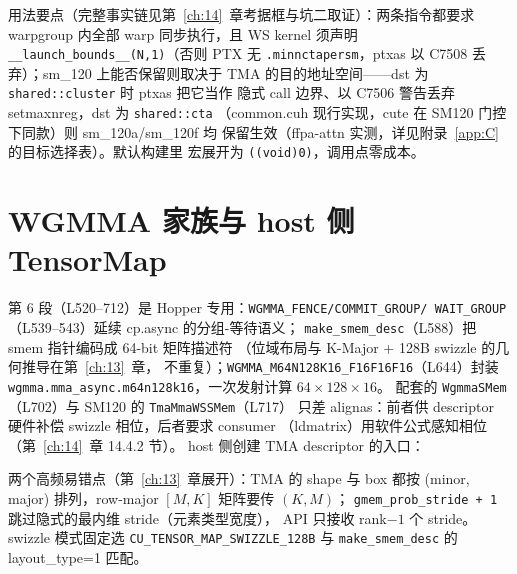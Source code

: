 

用法要点（完整事实链见第~\ref{ch:14}~章考据框与坑二取证）：两条指令都要求
warpgroup 内全部 warp 同步执行，且 WS kernel 须声明
\texttt{\_\allowbreak{}\_\allowbreak{}launch\_\allowbreak{}bounds\_\allowbreak{}\_\allowbreak{}(N,\allowbreak{}1)}（否则 PTX 无
\texttt{.minnctapersm}，ptxas 以 C7508 丢弃）；sm\_120 上能否保留则取决于
TMA 的目的地址空间——dst 为 \texttt{shared::cluster} 时 ptxas 把它当作
隐式 call 边界、以 C7506 警告丢弃 setmaxnreg，dst 为 \texttt{shared::cta}
（common.cuh 现行实现，cute 在 SM120 门控下同款）则 sm\_120a/sm\_120f 均
保留生效（ffpa-attn 实测，详见附录~\ref{app:C} 的目标选择表）。默认构建里
宏展开为 \texttt{((void)0)}，调用点零成本。

\section{WGMMA 家族与 host 侧 TensorMap}

第 6 段（L520--712）是 Hopper 专用：\texttt{WGMMA\_\allowbreak{}FENCE/\allowbreak{}COMMIT\_\allowbreak{}GROUP/\allowbreak{}
WAIT\_\allowbreak{}GROUP}（L539--543）延续 cp.async 的分组-等待语义；
\texttt{make\_\allowbreak{}smem\_\allowbreak{}desc}（L588）把 smem 指针编码成 64-bit 矩阵描述符
（位域布局与 K-Major + 128B swizzle 的几何推导在第~\ref{ch:13}~章，
不重复）；\texttt{WGMMA\_\allowbreak{}M64\allowbreak{}N128\allowbreak{}K16\_\allowbreak{}F16\allowbreak{}F16\allowbreak{}F16}（L644）封装
\texttt{wgmma.\allowbreak{}mma\_\allowbreak{}async.\allowbreak{}m64n128k16}，一次发射计算 $64\times128\times16$。
配套的 \texttt{WgmmaSMem}（L702）与 SM120 的 \texttt{Tma\allowbreak{}Mma\allowbreak{}WSSMem}（L717）
只差 alignas：前者供 descriptor 硬件补偿 swizzle 相位，后者要求 consumer
（ldmatrix）用软件公式感知相位（第~\ref{ch:14}~章 14.4.2 节）。
host 侧创建 TMA descriptor 的入口：



两个高频易错点（第~\ref{ch:13}~章展开）：TMA 的 shape 与 box 都按
(minor, major) 排列，row-major $[M,K]$ 矩阵要传 $(K,M)$；
\texttt{gmem\_\allowbreak{}prob\_\allowbreak{}stride + 1} 跳过隐式的最内维 stride（元素类型宽度），
API 只接收 rank$-1$ 个 stride。swizzle 模式固定选
\texttt{CU\_\allowbreak{}TENSOR\_\allowbreak{}MAP\_\allowbreak{}SWIZZLE\_\allowbreak{}128\allowbreak{}B} 与 \texttt{make\_\allowbreak{}smem\_\allowbreak{}desc} 的
layout\_type=1 匹配。

